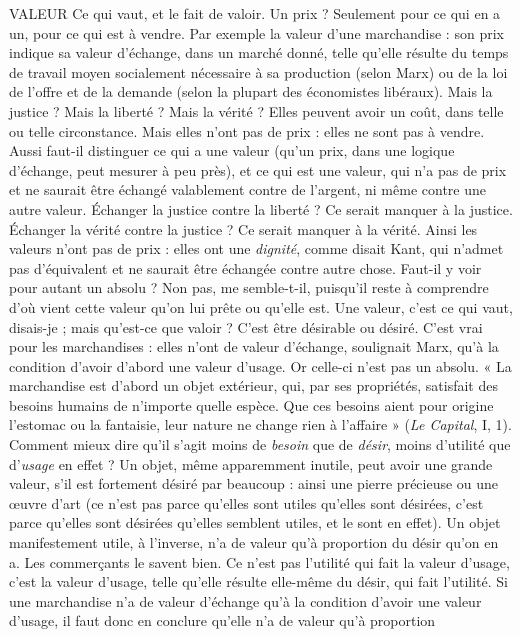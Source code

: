 VALEUR Ce qui vaut, et le fait de valoir. Un prix ? Seulement pour ce qui
en a un, pour ce qui est à vendre. Par exemple la valeur d’une
marchandise : son prix indique sa valeur d’échange, dans un marché donné,
telle qu’elle résulte du temps de travail moyen socialement nécessaire à sa production
(selon Marx) ou de la loi de l'offre et de la demande (selon la plupart
des économistes libéraux). Mais la justice ? Mais la liberté ? Mais la vérité ?
Elles peuvent avoir un coût, dans telle ou telle circonstance. Mais elles n’ont
pas de prix : elles ne sont pas à vendre. Aussi faut-il distinguer ce qui a une
valeur (qu’un prix, dans une logique d’échange, peut mesurer à peu près), et ce
qui est une valeur, qui n’a pas de prix et ne saurait être échangé valablement
contre de l'argent, ni même contre une autre valeur. Échanger la justice contre
la liberté ? Ce serait manquer à la justice. Échanger la vérité contre la justice ?
Ce serait manquer à la vérité. Ainsi les valeurs n’ont pas de prix : elles ont une
{\it dignité}, comme disait Kant, qui n’admet pas d’équivalent et ne saurait être
échangée contre autre chose. Faut-il y voir pour autant un absolu ? Non pas,
me semble-t-il, puisqu'il reste à comprendre d’où vient cette valeur qu’on lui
prête ou qu’elle est. Une valeur, c’est ce qui vaut, disais-je ; mais qu'est-ce que
valoir ? C’est être désirable ou désiré. C’est vrai pour les marchandises : elles
n’ont de valeur d'échange, soulignait Marx, qu’à la condition d’avoir d’abord
une valeur d'usage. Or celle-ci n’est pas un absolu. « La marchandise est
d’abord un objet extérieur, qui, par ses propriétés, satisfait des besoins humains
de n’importe quelle espèce. Que ces besoins aient pour origine l’estomac ou la
fantaisie, leur nature ne change rien à l’affaire » ({\it Le Capital}, I, 1). Comment
mieux dire qu’il s’agit moins de {\it besoin} que de {\it désir}, moins d’utilité que d’{\it usage}
en effet ? Un objet, même apparemment inutile, peut avoir une grande valeur,
s’il est fortement désiré par beaucoup : ainsi une pierre précieuse ou une œuvre
d’art (ce n’est pas parce qu’elles sont utiles qu’elles sont désirées, c’est parce
qu’elles sont désirées qu’elles semblent utiles, et le sont en effet). Un objet
manifestement utile, à l'inverse, n’a de valeur qu’à proportion du désir qu’on
en a. Les commerçants le savent bien. Ce n’est pas l'utilité qui fait la valeur
d'usage, c’est la valeur d’usage, telle qu’elle résulte elle-même du désir, qui fait
l'utilité. Si une marchandise n’a de valeur d'échange qu’à la condition d’avoir
une valeur d'usage, il faut donc en conclure qu’elle n’a de valeur qu’à proportion
